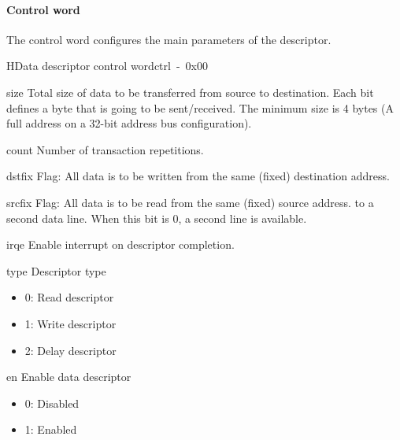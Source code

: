 \newpage
\paragraph{Control word} %
{

The control word configures the main parameters of the descriptor.\\

\begin{register}{H}{Data descriptor control word}{ctrl~-~0x00}
    \label{desc_control}%
    \regnewline%
    \begin{regdesc}\begin{reglist}
        \item [size]Total size of data to be transferred from source to destination.
		Each bit defines a byte that is going to be sent/received. The minimum size is 4 bytes (A full address on a 32-bit address bus configuration).
        \item [count]Number of transaction repetitions.
        \item [dstfix]Flag: All data is to be written from the same (fixed) destination address.
        \item [srcfix]Flag: All data is to be read from the same (fixed) source address.
            to a second data line. When this bit is 0, a second line
            is available.
        \item [irqe]Enable interrupt on descriptor completion.
        \item [type]Descriptor type
		\begin{itemize}
  		\item 0: Read descriptor
  		\item 1: Write descriptor
  		\item 2: Delay descriptor
		\end{itemize}
        \item [en]Enable data descriptor 
		\begin{itemize}
  		\item 0: Disabled
  		\item 1: Enabled
		\end{itemize}
\end{reglist}\end{regdesc}\end{register}
}

